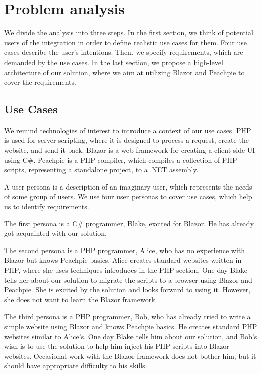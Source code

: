 \chapter{Problem analysis}
We divide the analysis into three steps.
In the first section, we think of potential users of the integration in order to define realistic use cases for them.
Four use cases describe the user's intentions.
Then, we specify requirements, which are demanded by the use cases.
In the last section, we propose a high-level architecture of our solution, where we aim at utilizing Blazor and Peachpie to cover the requirements.

\section{Use Cases}
We remind technologies of interest to introduce a context of our use cases.
PHP is used for server scripting, where it is designed to process a request, create the website, and send it back.
Blazor is a web framework for creating a client-side UI using C\#.
Peachpie is a PHP compiler, which compiles a collection of PHP scripts, representing a standalone project, to a .NET assembly.
\par
A user persona  is a description of an imaginary user, which represents the needs of some group of users.
We use four user personas to cover use cases, which help us to identify requirements.
\par
The first persona is a C\# programmer, Blake, excited for Blazor.
He has already got acquainted with our solution.
\par
The second persona is a PHP programmer, Alice, who has no experience with Blazor but knows Peachpie basics.
Alice creates standard websites written in PHP, where she uses techniques introduces in the PHP section.
One day Blake tells her about our solution to migrate the scripts to a browser using Blazor and Peachpie.
She is excited by the solution and looks forward to using it.
However, she does not want to learn the Blazor framework.
\par
The third persona is a PHP programmer, Bob, who has already tried to write a simple website using Blazor and knows Peachpie basics.
He creates standard PHP websites similar to Alice's.
One day Blake tells him about our solution, and Bob's wish is to use the solution to help him inject his PHP scripts into Blazor websites.
Occasional work with the Blazor framework does not bother him, but it should have appropriate difficulty to his skills.
